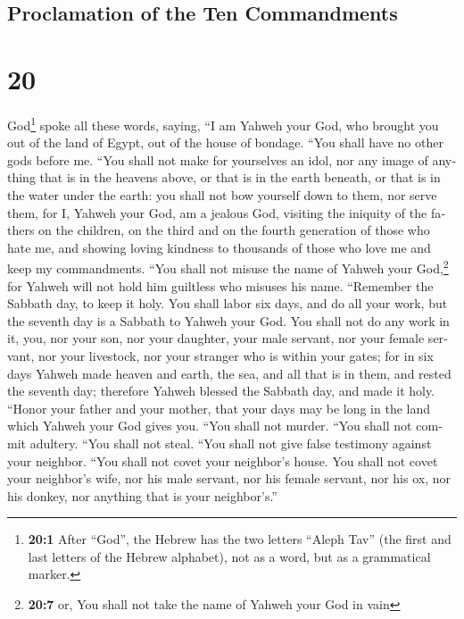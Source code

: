 \begin{paracol}{2}
\switchcolumn
\begin{otherlanguage}{english}

\hypertarget{proclamation-of-the-ten-commandments}{%
\subsection{Proclamation of the Ten
Commandments}\label{proclamation-of-the-ten-commandments}}

\hypertarget{section-39}{%
\section{20}\label{section-39}}

 God\footnote{\textbf{20:1} After ``God'', the Hebrew has
  the two letters ``Aleph Tav'' (the first and last letters of the
  Hebrew alphabet), not as a word, but as a grammatical marker.} spoke
all these words, saying,  ``I am Yahweh your God, who
brought you out of the land of Egypt, out of the house of bondage.
 ``You shall have no other gods before me. 
``You shall not make for yourselves an idol, nor any image of anything
that is in the heavens above, or that is in the earth beneath, or that
is in the water under the earth:  you shall not bow
yourself down to them, nor serve them, for I, Yahweh your God, am a
jealous God, visiting the iniquity of the fathers on the children, on
the third and on the fourth generation of those who hate me,
 and showing loving kindness to thousands of those who
love me and keep my commandments.  ``You shall not misuse
the name of Yahweh your God,\footnote{\textbf{20:7} or, You shall not
  take the name of Yahweh your God in vain} for Yahweh will not hold him
guiltless who misuses his name.  ``Remember the Sabbath
day, to keep it holy.  You shall labor six days, and do
all your work,  but the seventh day is a Sabbath to
Yahweh your God. You shall not do any work in it, you, nor your son, nor
your daughter, your male servant, nor your female servant, nor your
livestock, nor your stranger who is within your gates; 
for in six days Yahweh made heaven and earth, the sea, and all that is
in them, and rested the seventh day; therefore Yahweh blessed the
Sabbath day, and made it holy.  ``Honor your father and
your mother, that your days may be long in the land which Yahweh your
God gives you.  ``You shall not murder. 
``You shall not commit adultery.  ``You shall not steal.
 ``You shall not give false testimony against your
neighbor.  ``You shall not covet your neighbor's house.
You shall not covet your neighbor's wife, nor his male servant, nor his
female servant, nor his ox, nor his donkey, nor anything that is your
neighbor's.''


\end{otherlanguage}
\end{paracol}

